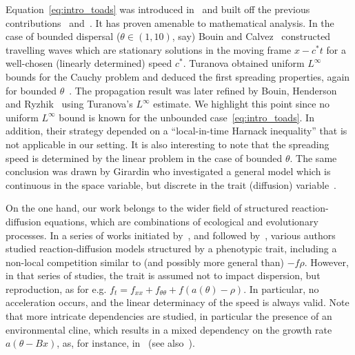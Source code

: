 \documentclass[AHL,Unicode,longabstracts]{cedram}
\newcommand{\1}{\mathds{1}}
\begin{document}
Equation~\eqref{eq:intro_toads} was introduced in~\cite{BenichouEtAl} and built off the previous contributions~\cite{ChampagnatMeleard} and~\cite{ArnoldDesvillettesPrevost}. It has proven amenable to mathematical analysis. In the case of bounded dispersal ($\theta\in (1,10)$, say) Bouin and Calvez~\cite{BouinCalvez} constructed travelling waves which are stationary solutions in the moving frame $x-c^*t$ for a well-chosen (linearly determined) speed $c^*$. Turanova obtained uniform $L^\infty$ bounds for the Cauchy problem and deduced the first spreading properties, again for bounded $\theta$~\cite{Turanova}. The propagation result was later refined by Bouin, Henderson and Ryzhik~\cite{BHR_LogDelay} using Turanova's $L^\infty$ estimate. We highlight this point since no uniform $L^\infty$ bound is known for the unbounded case~\eqref{eq:intro_toads}. In addition, their strategy depended on a ``local-in-time Harnack inequality'' that is not applicable in our setting. It is also interesting to note that the spreading speed is determined by the linear problem in the case of bounded $\theta$. The same conclusion was drawn by Girardin who investigated a general model which is continuous in the space variable, but discrete in the trait (diffusion) variable~\cite{girardin_non-cooperative_2018,girardin_non-cooperative_2018-1}.



On the one hand, our work belongs to the wider field of structured reaction-diffusion equations, which are combinations of ecological and evolutionary processes. In a series of works initiated by~\cite{AlfaroCovilleRaoul}, and followed by~\cite{AlfaroBerestyckiRaoul,BerestyckiJinSilvestre,BouinMirrahimi}, various authors studied reaction-diffusion models structured by a phenotypic trait, including a non-local competition similar to (and possibly more general than) $-f\rho$. However, in that series of studies, the trait is assumed not to impact dispersion, but reproduction, as for e.g. $f_t = f_{xx} + f_{\theta\theta} + f(a(\theta)-\rho)$. In particular, no acceleration occurs, and the linear determinacy of the speed is always valid. Note that more intricate dependencies are studied, in particular the presence of an environmental cline, which results in a mixed dependency on the growth rate $a(\theta - Bx)$, as, for instance, in~\cite{AlfaroBerestyckiRaoul,AlfaroCovilleRaoul} (see also~\cite{BouinMirrahimi}).
\end{document}
